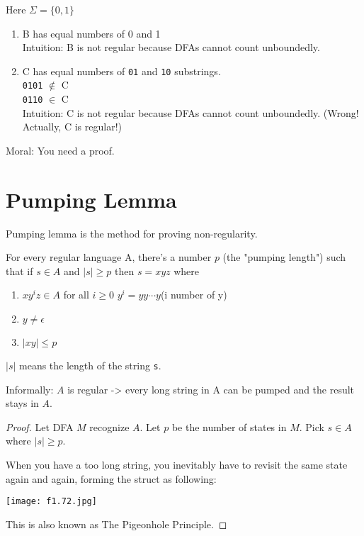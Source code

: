\begin{eg}
    Here \(\Sigma = \{ 0, 1 \} \) 

    \begin{enumerate}
        \item B has equal numbers of 0 and 1\\
        Intuition: B is not regular because DFAs cannot count unboundedly.
        \item C has equal numbers of \verb|01| and \verb|10| substrings.\\
        \verb|0101| \(\notin\) C \\
        \verb|0110| \(\in\) C\\ 
        Intuition: C is not regular because DFAs cannot count unboundedly. (Wrong! Actually, C is regular!)
    \end{enumerate}

    Moral: You need a proof.
\end{eg}


\section{Pumping Lemma}
Pumping lemma is the method for proving non-regularity.

\begin{lemma}
    For every regular language A, there's a number \(p\) (the "pumping length") such that  
    if \(s \in A\) and \(|s| \geq p\) then \(s = xyz\) where 
    \begin{enumerate}
        \item \(xy^iz \in A\) for all \(i \geq 0\) \quad \(y^i = yy\cdots y\)(i number of y)
        \item \(y \neq \epsilon\)
        \item \(|xy| \leq p\)     
    \end{enumerate}
    \begin{remark}
        \(|s|\) means the length of the string \verb|s|. 
    \end{remark}
    \hfill \break
    Informally: \(A\) is regular -> every long string in A can be pumped and the result stays in \(A\).  
\end{lemma}
\begin{proof}
    Let DFA \(M\) recognize \(A\). Let \(p\) be the number of states in \(M\). Pick \(s \in A\) where \(|s| \geq p\).      

    When you have a too long string, you inevitably have to revisit the same state again and again, forming the struct as following:

    \texttt{[image: f1.72.jpg]}

    This is also known as The Pigeonhole Principle.
\end{proof}

